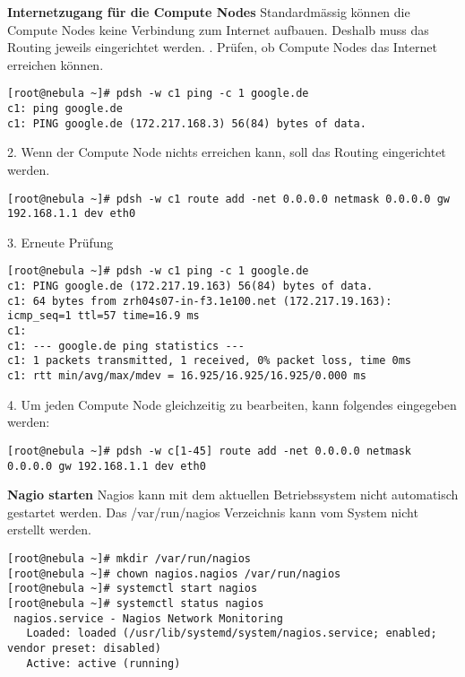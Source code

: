 \textbf{Internetzugang für die Compute Nodes}\newline
Standardmässig können die Compute Nodes keine Verbindung zum Internet aufbauen. Deshalb muss das Routing jeweils eingerichtet werden. . Prüfen, ob Compute Nodes das Internet erreichen können.
\begin{lstlisting}
[root@nebula ~]# pdsh -w c1 ping -c 1 google.de
c1: ping google.de
c1: PING google.de (172.217.168.3) 56(84) bytes of data.
\end{lstlisting}
2. Wenn der Compute Node nichts erreichen kann, soll das Routing eingerichtet werden.
\begin{lstlisting}
[root@nebula ~]# pdsh -w c1 route add -net 0.0.0.0 netmask 0.0.0.0 gw 192.168.1.1 dev eth0
\end{lstlisting}
3. Erneute Prüfung 
\begin{lstlisting}
[root@nebula ~]# pdsh -w c1 ping -c 1 google.de
c1: PING google.de (172.217.19.163) 56(84) bytes of data.
c1: 64 bytes from zrh04s07-in-f3.1e100.net (172.217.19.163): icmp_seq=1 ttl=57 time=16.9 ms
c1:
c1: --- google.de ping statistics ---
c1: 1 packets transmitted, 1 received, 0% packet loss, time 0ms
c1: rtt min/avg/max/mdev = 16.925/16.925/16.925/0.000 ms
\end{lstlisting}
4. Um jeden Compute Node gleichzeitig zu bearbeiten, kann folgendes eingegeben werden:
\begin{lstlisting}
[root@nebula ~]# pdsh -w c[1-45] route add -net 0.0.0.0 netmask 0.0.0.0 gw 192.168.1.1 dev eth0
\end{lstlisting}

\textbf{Nagio starten}\newline
Nagios kann mit dem aktuellen Betriebssystem nicht automatisch gestartet werden. Das /var/run/nagios Verzeichnis kann vom System nicht erstellt werden.
\begin{lstlisting}
[root@nebula ~]# mkdir /var/run/nagios
[root@nebula ~]# chown nagios.nagios /var/run/nagios
[root@nebula ~]# systemctl start nagios
[root@nebula ~]# systemctl status nagios
 nagios.service - Nagios Network Monitoring
   Loaded: loaded (/usr/lib/systemd/system/nagios.service; enabled; vendor preset: disabled)
   Active: active (running) 
\end{lstlisting}

